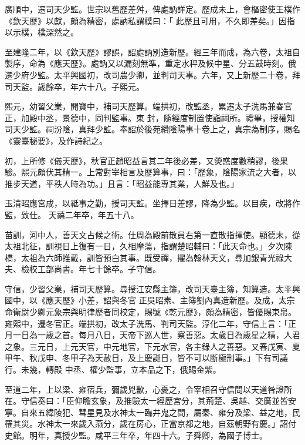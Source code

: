 \begin{pinyinscope}
 廣順中，遷司天少監。世宗以舊歷差舛，俾處訥詳定。歷成未上，會樞密使王樸作《欽天歷》以獻，頗為精密，處訥私謂樸曰：「
 此歷且可用，不久即差矣。」因指以示樸，樸深然之。



 至建隆二年，以《欽天歷》謬誤，詔處訥別造新歷。經三年而成，為六卷，太祖自製序，命為《應天歷》。處訥又以漏刻無準，重定水秤及候中星、分五鼓時刻。俄遷少府少監。太平興國初，改司農少卿，並判司天事。六年，又上新歷二十卷，拜司天監。歲餘卒，年六十八。子熙元。



 熙元，幼習父業，開寶中，補司天歷算。端拱初，改監丞，累遷太子洗馬兼春官正，加殿中丞，景德中，同判監事。東
 封，隨經度制置使詣祠所。禮畢，授權知司天少監。祠汾陰，真拜少監。奉詔於後苑纘陰陽事十卷上之，真宗為制序，賜名《靈臺秘要》，及作詩紀之。



 初，上所修《儀天歷》，秋官正趙昭益言其二年後必差，又熒惑度數稍謬，後果驗。熙元頗伏其精一。上常對宰相言及歷算事，曰：「歷象，陰陽家流之大者，以推步天道，平秩人時為功。」且言：「昭益能專其業，人鮮及也。」



 玉清昭應宮成，以祗事之勤，授司天監。坐擇日差謬，降為少監。以目疾，改將作監，致仕。
 天禧二年卒，年五十八。



 苗訓，河中人，善天文占候之術。仕周為殿前散員右第一直散指揮使。顯德末，從太祖北征，訓視日上復有一日，久相摩蕩，指謂楚昭輔曰：「此天命也。」夕次陳橋，太祖為六師推戴，訓皆預白其事。既受禪，擢為翰林天文，尋加銀青光祿大夫、檢校工部尚書。年七十餘卒。子守信。



 守信，少習父業，補司天歷算。尋授江安縣主簿，改司天臺主簿，知算造。太平興國中，以《應天歷》小差，詔與冬官
 正吳昭素、主簿劉內真造新歷。及成，太宗命衛尉少卿元象宗與明律歷者同校定，賜號《乾元歷》，頗為精密，皆優賜束帛。雍熙中，遷冬官正。端拱初，改太子洗馬、判司天監。淳化二年，守信上言：「正月一日為一歲之首。每月八日，天帝下巡人世，察善惡。太歲日為歲星之精，人君之象。三元日，上元天官，中元地官，下元水官，各主錄人之善惡。又春戊寅、夏甲午、秋戊申、冬甲子為天赦日，及上慶誕日，皆不可以斷極刑事。」下有司議行。未幾，轉殿
 中丞、權少監事，立本品之下，俄賜金紫。



 至道二年，上以梁、雍宿兵，彌歲兇歉，心憂之，令宰相召守信問以天道咎證所在。守信奏曰：「臣仰瞻玄象，及推驗太一經歷宮分，其荊楚、吳越、交廣並皆安寧。自來五緯陵犯、彗星見及水神太一臨井鬼之間，屬秦、雍分及梁、益之地，民罹其災。水神太一來歲入燕分，歲在房心，正當京都之地，自茲朝野有慶。」詔付史館。明年，真授少監。咸平三年卒，年四十六。子舜卿，為國子博士。




\end{pinyinscope}
